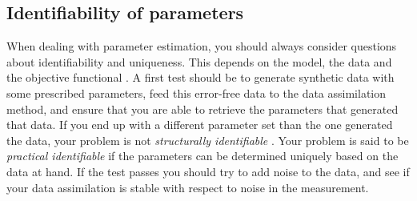 



\subsection{Identifiability of parameters}
When dealing with parameter estimation, you should always consider
questions about identifiability and uniqueness. This depends on the
model, the data and the objective functional
\cite{hadjicharalambous2015analysis}. A first test should be to
generate synthetic data with some prescribed parameters, feed this
error-free data to the data assimilation method, and ensure that you
are able to retrieve the parameters that generated that data. If you
end up with a different parameter set than the one generated the data,
your problem is not \emph{structurally identifiable}
\cite{chabiniok2016multiphysics}. Your problem is said to be
\emph{practical identifiable} if the parameters can be determined
uniquely based on the data at hand. If the test passes you should try
to add noise to the data, and see if your data assimilation is stable
with respect to noise in the measurement.

